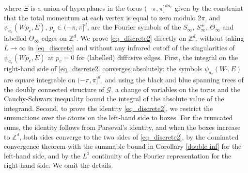 \documentclass{article}
\newcommand{\1}{\mathds{1}}
\numberwithin{equation}{section}
\renewcommand{\cal}{\mathcal}
\newcommand{\Z}{\mathbb{Z}}
\newcommand{\dashed}{\text{diffusive}}
\theoremstyle{plain} %
\theoremstyle{remark}
\newcommand{\cor}{\color{red}}
\begin{document}
where $\Xi$ is a union of hyperplanes in the torus $(-\pi,\pi]^{d n_e}$ given by the constraint that the total momentum at each vertex is equal to zero modulo $2\pi$, and $\psi_{a_e}(Wp_e,E)$, $p_e\in (-\pi,\pi]^d$, are the Fourier symbols of the $S_\infty$, $S^\pm_\infty$, $\Theta_\infty$ and labelled $\Theta_\infty$ edges on $\Z^d$. We prove \eqref{eq_discrete2} directly on $\Z^d$, without taking $L\to \infty$ in \eqref{eq_discrete} and without any infrared cutoff of the singularities of $\psi_{a_e}(Wp_e, E)$ at $p_e=0$ for (labelled) $\dashed$ edges. First, the integral on the right-hand side of \eqref{eq_discrete2} converges absolutely: the symbols $\psi_{a_e}(W\cdot, E)$ are square integrable on $(-\pi,\pi]^d$, and using the black and blue spanning trees of the doubly connected structure of $\cal G$, a change of variables on the torus and the Cauchy-Schwarz inequality bound the integral of the absolute value of the integrand. Second, to prove the identity \eqref{eq_discrete2}, we restrict the summations over the atoms on the left-hand side to boxes. For the truncated sums, the identity follows from Parseval's identity, and when the boxes increase to $\Z^d$, both sides converge to the two sides of \eqref{eq_discrete2}, by the dominated convergence theorem with the summable bound in Corollary \ref{double inf} for the left-hand side, and by the $L^2$ continuity of the Fourier representation for the right-hand side. We omit the details.

\end{document}
